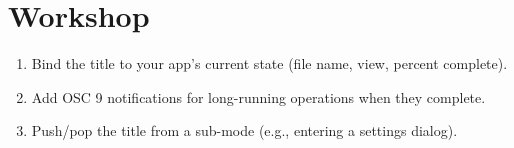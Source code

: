 \section*{Workshop}

\begin{enumerate}[leftmargin=*]
  \item Bind the title to your app's current state (file
    name, view, percent complete).
  \item Add OSC 9 notifications for long-running operations
    when they complete.
  \item Push/pop the title from a sub-mode (e.g., entering
    a settings dialog).
\end{enumerate}
